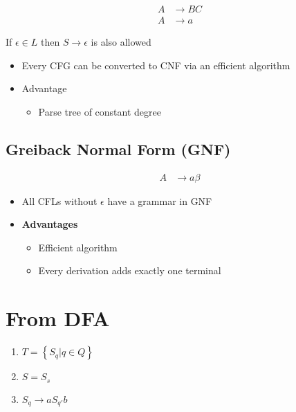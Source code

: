     \begin{align}
      A &\to BC \\
      A &\to a
    \end{align}

    If $ \epsilon \in L $ then $ S \to \epsilon $ is also allowed

    \begin{itemize}
      \item Every CFG can be converted to CNF via an efficient algorithm
      \item Advantage
      \begin{itemize}
        \item Parse tree of constant degree
      \end{itemize}
    \end{itemize}

  \subsection{Greiback Normal Form (GNF)}

    \begin{align}
      A &\to a \beta
    \end{align}

    \begin{itemize}
      \item All CFLs without $ \epsilon $ have a grammar in GNF
      \item \textbf{Advantages}
      \begin{itemize}
        \item Efficient algorithm
        \item Every derivation adds exactly one terminal
      \end{itemize}
    \end{itemize}

\section{From DFA}

  \begin{enumerate}
    \item $ T = \left\{ S_{q} | q \in Q \right\} $
    \item $ S = S_{s} $
    \item $ S_{q} \to a S_{q'} b $
  \end{enumerate}
